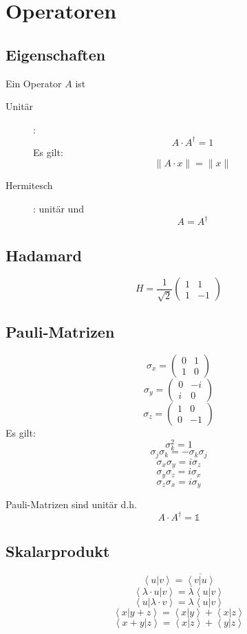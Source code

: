 \documentclass{article}
\begin{document}
\section{Operatoren}
\subsection{Eigenschaften}
Ein Operator $A$ ist
\begin{description}
\item[Unitär]:
  \[ A\cdot A^\dagger = 1 \]
  Es gilt:
  \[ \| A\cdot x \| = \| x \| \]
\item[Hermitesch]: unitär und
  \[ A = A^\dagger \]
\end{description}
\subsection{Hadamard}

\[ H = \frac{1}{\sqrt{2}}\left(\begin{array}{rr}
    1 &  1\\
    1 & -1
  \end{array}\right) \]
\subsection{Pauli-Matrizen}
\[ \sigma_x = \left(\begin{array}{rr}
    0 & 1\\
    1 & 0
  \end{array} \right) \]
\[ \sigma_y = \left(\begin{array}{rr}
    0 & -i\\
    i & 0
  \end{array} \right) \]
\[ \sigma_z = \left(\begin{array}{rr}
    1 & 0\\
    0 & -1
  \end{array}\right) \]
Es gilt:
\[ \sigma_k^2 = 1 \]
\[ \sigma_j\sigma_k = -\sigma_k\sigma_j \]
\[ \sigma_x\sigma_y = i\sigma_z \]
\[ \sigma_y\sigma_z = i\sigma_x \]
\[ \sigma_z\sigma_x = i\sigma_y \]

Pauli-Matrizen sind unitär d.h. 
\[ A \cdot A^{\dagger} = \mathbb{1} \]
\subsection{Skalarprodukt}
\[ \left<u|v\right> = \overline{\left<v|u\right>} \]
\[ \left<\lambda\cdot u|v\right> = \overline{\lambda}\left<u|v\right> \]
\[ \left<u|\lambda\cdot v\right> = \lambda\left<u|v\right> \]
\[ \left<x|y+z\right> = \left<x|y\right> + \left<x|z\right> \]
\[ \left<x+y|z\right> = \left<x|z\right> + \left<y|z\right> \]
\end{document}
